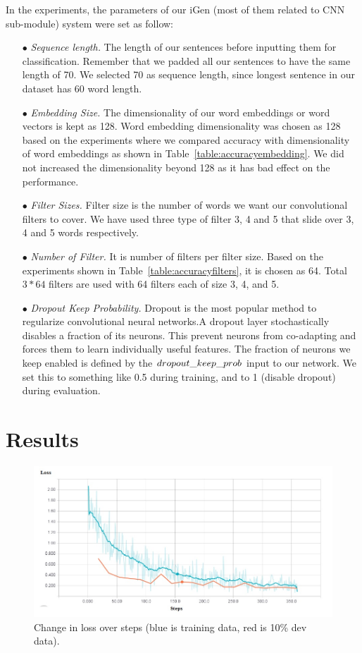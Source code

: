 In the experiments, the parameters of our iGen (most of them related to CNN sub-module) system were set as follow:
\begin{itemize}
 \item[$\bullet$ ] \textit{Sequence length.} The length of our sentences before inputting them for classification. Remember that we padded all our sentences to have the same length of 70. We selected 70 as sequence length, since longest sentence in our dataset has 60 word length.
  \item[$\bullet$ ] \textit{Embedding Size.} The dimensionality of our word embeddings or word vectors is kept as 128. Word embedding dimensionality was chosen as 128 based on the experiments where we compared accuracy with dimensionality of word embeddings as shown in Table~\ref{table:accuracyembedding}. We did not increased the dimensionality beyond 128 as it has bad effect on the performance.   
  \item[$\bullet$ ] \textit{Filter Sizes.} Filter size is the number of words we want our convolutional filters to cover. We have used three type of filter 3, 4 and 5 that slide over 3, 4 and 5 words respectively. 
  \item[$\bullet$ ] \textit{Number of Filter.} It is number of filters per filter size. Based on the experiments shown in Table~\ref{table:accuracyfilters}, it is chosen as 64. Total $3*64$ filters are used with 64 filters each of size 3, 4, and 5.
  \item[$\bullet$ ] \textit{Dropout Keep Probability.} Dropout is the most popular method to regularize convolutional neural networks.A dropout layer stochastically disables a fraction of its neurons. This prevent neurons from co-adapting and forces them to learn individually useful features. The fraction of neurons we keep enabled is defined by the $dropout\char`_keep\char`_prob$ input to our network. We set this to something like 0.5 during training, and to 1 (disable dropout) during evaluation.
  
\end{itemize}

\section{Results}

\begin{figure}[tb]
\centering
\includegraphics [width=\linewidth]{LossOverSteps.jpg}
\caption{Change in loss over steps (blue is training data, red is 10\% dev data).}
\label{fig:loss}
\end{figure}

